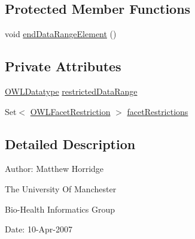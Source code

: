 \subsection*{Protected Member Functions}
\begin{DoxyCompactItemize}
\item 
void \hyperlink{classorg_1_1coode_1_1owlapi_1_1owlxmlparser_1_1_o_w_l_datatype_restriction_element_handler_a28f0902f9f361ba8d8a79afa6f58c752}{end\-Data\-Range\-Element} ()
\end{DoxyCompactItemize}
\subsection*{Private Attributes}
\begin{DoxyCompactItemize}
\item 
\hyperlink{interfaceorg_1_1semanticweb_1_1owlapi_1_1model_1_1_o_w_l_datatype}{O\-W\-L\-Datatype} \hyperlink{classorg_1_1coode_1_1owlapi_1_1owlxmlparser_1_1_o_w_l_datatype_restriction_element_handler_af85fa76c23bbbcc422adfd0a4ba0e414}{restricted\-Data\-Range}
\item 
Set$<$ \hyperlink{interfaceorg_1_1semanticweb_1_1owlapi_1_1model_1_1_o_w_l_facet_restriction}{O\-W\-L\-Facet\-Restriction} $>$ \hyperlink{classorg_1_1coode_1_1owlapi_1_1owlxmlparser_1_1_o_w_l_datatype_restriction_element_handler_ae6bf937a22a5df32098a78f64a61f6e1}{facet\-Restrictions}
\end{DoxyCompactItemize}


\subsection{Detailed Description}
Author\-: Matthew Horridge\par
 The University Of Manchester\par
 Bio-\/\-Health Informatics Group\par
 Date\-: 10-\/\-Apr-\/2007\par
\par
 

